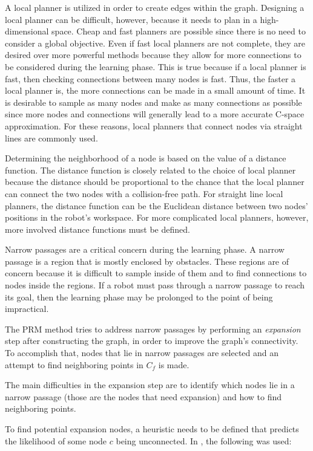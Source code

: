 \documentclass[10pt,conference]{ieeeconf}
\begin{document}
A local planner is utilized in order to create edges within the graph. Designing a local planner can be difficult, however, because it needs to plan in a high-dimensional space. Cheap and fast planners are possible since there is no need to consider a global objective. Even if fast local planners are not complete, they are desired over more powerful methods because they allow for more connections to be considered during the learning phase. This is true because if a local planner is fast, then checking connections between many nodes is fast. Thus, the faster a local planner is, the more connections can be made in a small amount of time. It is desirable to sample as many nodes and make as many connections as possible since more nodes and connections will generally lead to a more accurate C-space approximation. For these reasons, local planners that connect nodes via straight lines are commonly used.

Determining the neighborhood of a node is based on the value of a distance function. The distance function is closely related to the choice of local planner because the distance should be proportional to the chance that the local planner can connect the two nodes with a collision-free path. For straight line local planners, the distance function can be the Euclidean distance between two nodes' positions in the robot's workspace. For more complicated local planners, however, more involved distance functions must be defined.  

Narrow passages are a critical concern during the learning phase. A narrow passage is a region that is mostly enclosed by obstacles. These regions are of concern because it is difficult to sample inside of them and to find connections to nodes inside the regions. If a robot must pass through a narrow passage to reach its goal, then the learning phase may be prolonged to the point of being impractical. 

The PRM method tries to address narrow passages by performing an \emph{expansion} step after constructing the graph, in order to improve the graph's connectivity. To accomplish that, nodes that lie in narrow passages are selected and an attempt to find neighboring points in $C_f$ is made. 

The main difficulties in the expansion step are to identify which nodes lie in a narrow passage (those are the nodes that need expansion) and how to find neighboring points.

To find potential expansion nodes, a heuristic needs to be defined that predicts the likelihood of some node $c$ being unconnected. In \cite{PRM}, the following was used:
\end{document}
